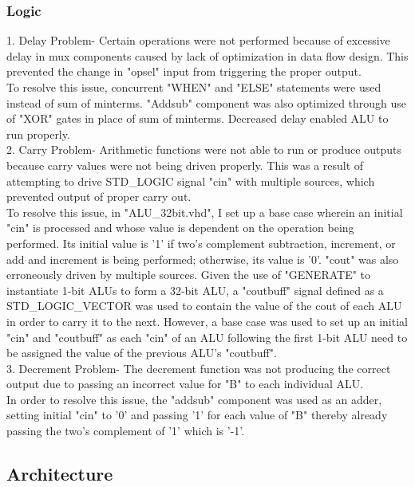 \documentclass[paper=letter, fontsize=11pt]{scrartcl}
\numberwithin{equation}{section} %
\numberwithin{figure}{section} %
\numberwithin{table}{section} %
\begin{document}
\subsubsection{Logic}
\begin{flushleft}
	1. Delay Problem- Certain operations were not performed because of excessive delay in mux components caused by lack of optimization in data flow design. This prevented the change in "opsel" input from triggering the proper output.\\ 
	To resolve this issue, concurrent "WHEN" and "ELSE" statements were used instead of sum of minterms. "Addsub" component was also optimized through use of "XOR" gates in place of sum of minterms. Decreased delay enabled ALU to run properly.\\[10pt] 

	2. Carry Problem- Arithmetic functions were not able to run or produce outputs because carry values were not being driven properly. This was a result of attempting to drive STD\_LOGIC signal "cin" with multiple sources, which prevented output of proper carry out.\\ 
	To resolve this issue, in "ALU\_32bit.vhd", I set up a base case wherein an initial "cin" is processed and whose value is dependent on the operation being performed. Its initial value is '1' if two's complement subtraction, increment, or add and increment is being performed; otherwise, its value is '0'.
	"cout" was also erroneously driven by multiple sources. Given the use of "GENERATE" to instantiate 1-bit ALUs to form a 32-bit ALU, a "coutbuff" signal defined as a STD\_LOGIC\_VECTOR was used to contain the value of the cout of each ALU in order to carry it to the next. However,
	a base case was used to set up an initial "cin" and "coutbuff" as each "cin" of an ALU following the first 1-bit ALU need to be assigned the value of the previous ALU's "coutbuff".\\[10pt]

	3. Decrement Problem- The decrement function was not producing the correct output due to passing an incorrect value for "B" to each individual ALU. \\In order to resolve this issue, the "addsub" component was used as an adder, setting initial "cin" to '0' and passing '1' for each value of "B" thereby already passing the two's complement of '1' which is '-1'.\\[20pt]
\end{flushleft}

\subsection{Architecture}
\end{document}
